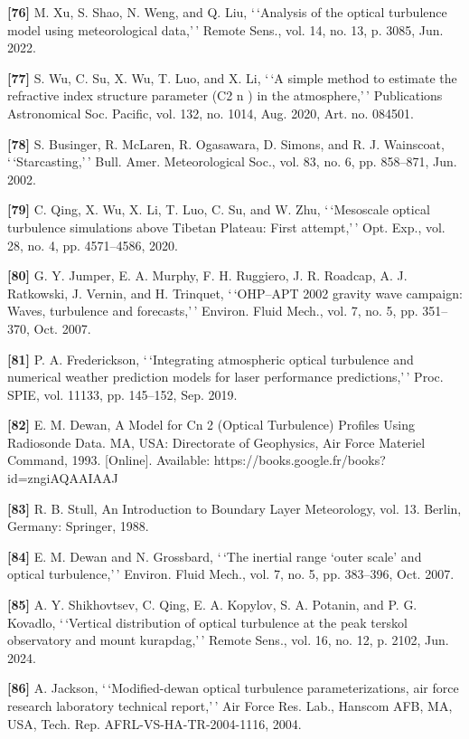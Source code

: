 \documentclass[
]{article}
\begin{document}
\textbf{{[}76{]}} M. Xu, S. Shao, N. Weng, and Q. Liu, `\,`Analysis of
the optical turbulence model using meteorological data,'\,' Remote
Sens., vol. 14, no. 13, p. 3085, Jun. 2022.

\textbf{{[}77{]}} S. Wu, C. Su, X. Wu, T. Luo, and X. Li, `\,`A simple
method to estimate the refractive index structure parameter (C2 n ) in
the atmosphere,'\,' Publications Astronomical Soc. Pacific, vol. 132,
no. 1014, Aug. 2020, Art. no. 084501.

\textbf{{[}78{]}} S. Businger, R. McLaren, R. Ogasawara, D. Simons, and
R. J. Wainscoat, `\,`Starcasting,'\,' Bull. Amer. Meteorological Soc.,
vol. 83, no. 6, pp. 858--871, Jun. 2002.

\textbf{{[}79{]}} C. Qing, X. Wu, X. Li, T. Luo, C. Su, and W. Zhu,
`\,`Mesoscale optical turbulence simulations above Tibetan Plateau:
First attempt,'\,' Opt. Exp., vol. 28, no. 4, pp. 4571--4586, 2020.

\textbf{{[}80{]}} G. Y. Jumper, E. A. Murphy, F. H. Ruggiero, J. R.
Roadcap, A. J. Ratkowski, J. Vernin, and H. Trinquet, `\,`OHP--APT 2002
gravity wave campaign: Waves, turbulence and forecasts,'\,' Environ.
Fluid Mech., vol. 7, no. 5, pp. 351--370, Oct. 2007.

\textbf{{[}81{]}} P. A. Frederickson, `\,`Integrating atmospheric
optical turbulence and numerical weather prediction models for laser
performance predictions,'\,' Proc. SPIE, vol. 11133, pp. 145--152, Sep.
2019.

\textbf{{[}82{]}} E. M. Dewan, A Model for Cn 2 (Optical Turbulence)
Profiles Using Radiosonde Data. MA, USA: Directorate of Geophysics, Air
Force Materiel Command, 1993. {[}Online{]}. Available:
https://books.google.fr/books?id=zngiAQAAIAAJ

\textbf{{[}83{]}} R. B. Stull, An Introduction to Boundary Layer
Meteorology, vol. 13. Berlin, Germany: Springer, 1988.

\textbf{{[}84{]}} E. M. Dewan and N. Grossbard, `\,`The inertial range
`outer scale' and optical turbulence,'\,' Environ. Fluid Mech., vol. 7,
no. 5, pp. 383--396, Oct. 2007.

\textbf{{[}85{]}} A. Y. Shikhovtsev, C. Qing, E. A. Kopylov, S. A.
Potanin, and P. G. Kovadlo, `\,`Vertical distribution of optical
turbulence at the peak terskol observatory and mount kurapdag,'\,'
Remote Sens., vol. 16, no. 12, p. 2102, Jun. 2024.

\textbf{{[}86{]}} A. Jackson, `\,`Modified-dewan optical turbulence
parameterizations, air force research laboratory technical report,'\,'
Air Force Res. Lab., Hanscom AFB, MA, USA, Tech. Rep.
AFRL-VS-HA-TR-2004-1116, 2004.
\end{document}
